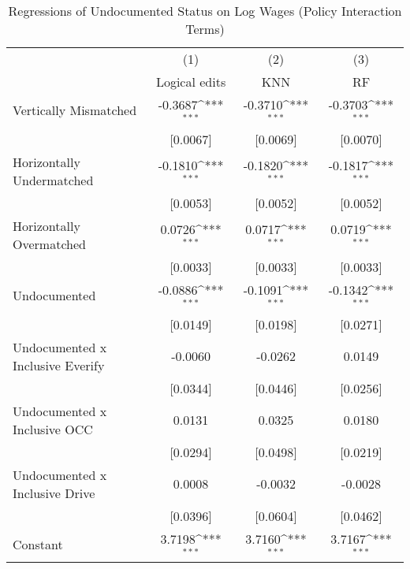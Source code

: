 \begin{table}[htbp]\centering
\def\sym#1{\ifmmode^{#1}\else\(^{#1}\)\fi}
\caption{Regressions of Undocumented Status on Log Wages (Policy Interaction Terms)}
\begin{tabular}{l*{3}{c}}
\toprule
                    &\multicolumn{1}{c}{(1)}         &\multicolumn{1}{c}{(2)}         &\multicolumn{1}{c}{(3)}         \\
                    &Logical edits         &         KNN         &          RF         \\
\midrule
Vertically Mismatched&     -0.3687\sym{***}&     -0.3710\sym{***}&     -0.3703\sym{***}\\
                    &    [0.0067]         &    [0.0069]         &    [0.0070]         \\
\addlinespace
Horizontally Undermatched&     -0.1810\sym{***}&     -0.1820\sym{***}&     -0.1817\sym{***}\\
                    &    [0.0053]         &    [0.0052]         &    [0.0052]         \\
\addlinespace
Horizontally Overmatched&      0.0726\sym{***}&      0.0717\sym{***}&      0.0719\sym{***}\\
                    &    [0.0033]         &    [0.0033]         &    [0.0033]         \\
\addlinespace
Undocumented        &     -0.0886\sym{***}&     -0.1091\sym{***}&     -0.1342\sym{***}\\
                    &    [0.0149]         &    [0.0198]         &    [0.0271]         \\
\addlinespace
Undocumented x Inclusive Everify&     -0.0060         &     -0.0262         &      0.0149         \\
                    &    [0.0344]         &    [0.0446]         &    [0.0256]         \\
\addlinespace
Undocumented x Inclusive OCC&      0.0131         &      0.0325         &      0.0180         \\
                    &    [0.0294]         &    [0.0498]         &    [0.0219]         \\
\addlinespace
Undocumented x Inclusive Drive&      0.0008         &     -0.0032         &     -0.0028         \\
                    &    [0.0396]         &    [0.0604]         &    [0.0462]         \\
\addlinespace
Constant            &      3.7198\sym{***}&      3.7160\sym{***}&      3.7167\sym{***}\\

\end{tabular}
\end{table}
